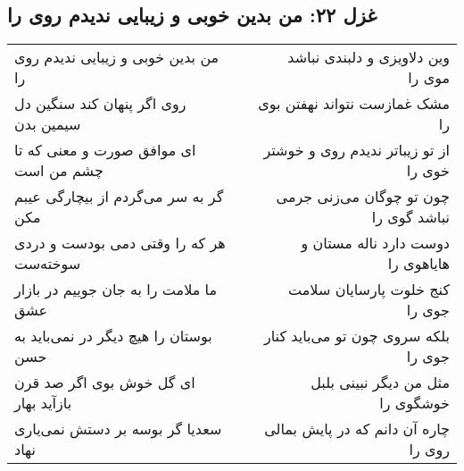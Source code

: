 \begin{center}
\section*{غزل ۲۲: من بدین خوبی و زیبایی ندیدم روی را}
\label{sec:022}
\begin{longtable}{l p{0.5cm} r}
من بدین خوبی و زیبایی ندیدم روی را
&&
وین دلاویزی و دلبندی نباشد موی را
\\
روی اگر پنهان کند سنگین دل سیمین بدن
&&
مشک غمازست نتواند نهفتن بوی را
\\
ای موافق صورت و معنی که تا چشم من است
&&
از تو زیباتر ندیدم روی و خوشتر خوی را
\\
گر به سر می‌گردم از بیچارگی عیبم مکن
&&
چون تو چوگان می‌زنی جرمی نباشد گوی را
\\
هر که را وقتی دمی بودست و دردی سوخته‌ست
&&
دوست دارد ناله مستان و هایاهوی را
\\
ما ملامت را به جان جوییم در بازار عشق
&&
کنج خلوت پارسایان سلامت جوی را
\\
بوستان را هیچ دیگر در نمی‌باید به حسن
&&
بلکه سروی چون تو می‌باید کنار جوی را
\\
ای گل خوش بوی اگر صد قرن بازآید بهار
&&
مثل من دیگر نبینی بلبل خوشگوی را
\\
سعدیا گر بوسه بر دستش نمی‌یاری نهاد
&&
چاره آن دانم که در پایش بمالی روی را
\\
\end{longtable}
\end{center}
